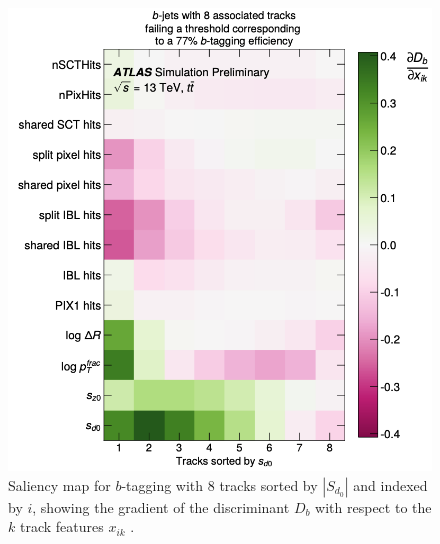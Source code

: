 \begin{figure}[h!]
  \center
  \begin{minipage}[c]{0.7\textwidth}
    \includegraphics[width=\textwidth]{Images/FTAG/dipsSaliency.png}
  \end{minipage}
  \begin{minipage}[c]{0.25\textwidth}
    \caption{Saliency map for $b$-tagging with 8 tracks sorted by $|S_{d_0}|$ and indexed by $i$, showing the gradient of the discriminant $D_b$ with respect to the $k$ track features $x_{ik}$ \cite{ATL-PHYS-PUB-2020-014}.} 
  \label{fig:dipsSaliency}
  \end{minipage}
\end{figure}

